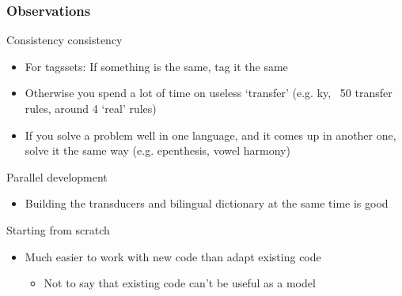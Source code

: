 \documentclass[10pt,xetex]{beamer} %
\begin{document}
\begin{frame}
  \frametitle{Observations}

\begin{block}{Consistency consistency}
  \begin{itemize}
      \item For tagssets: If something is the same, tag it the same
      \item Otherwise you spend a lot of time on useless `transfer'
        (e.g. ky, ~50 transfer rules, around 4 `real' rules)
      \item If you solve a problem well in one language, and it comes up 
        in another one, solve it the same way (e.g. epenthesis, vowel harmony)
  \end{itemize}
\end{block}

\begin{block}{Parallel development}
  \begin{itemize}
    \item Building the transducers and bilingual dictionary at the same time is good
  \end{itemize}
\end{block}

\begin{block}{Starting from scratch}
  \begin{itemize}
    \item Much easier to work with new code than adapt existing code
    \begin{itemize}
      \item Not to say that existing code can't be useful as a model 
    \end{itemize}
  \end{itemize}
\end{block}

\end{frame}

\end{document}

